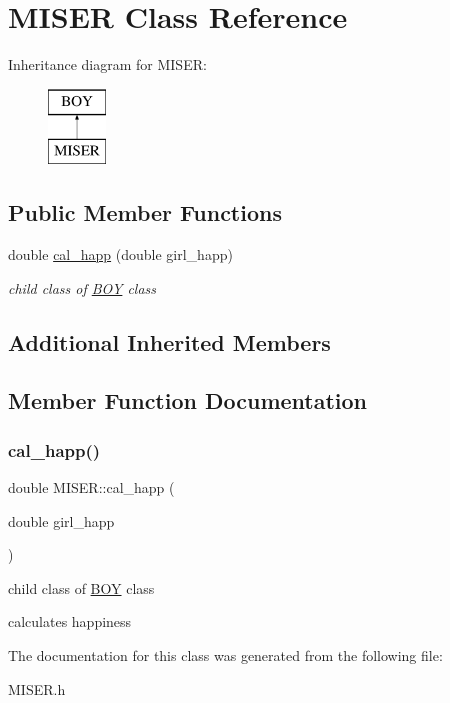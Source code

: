 \hypertarget{classMISER}{}\section{M\+I\+S\+ER Class Reference}
\label{classMISER}
Inheritance diagram for M\+I\+S\+ER\+:\begin{figure}[H]
\begin{center}
\leavevmode
\includegraphics[height=2.000000cm]{classMISER}
\end{center}
\end{figure}
\subsection*{Public Member Functions}
\begin{DoxyCompactItemize}
\item 
double \hyperlink{classMISER_a178be2918344f7c56b1d64b531053cd1}{cal\+\_\+happ} (double girl\+\_\+happ)
\begin{DoxyCompactList}\small\item\em child class of \hyperlink{classBOY}{B\+OY} class \end{DoxyCompactList}\end{DoxyCompactItemize}
\subsection*{Additional Inherited Members}


\subsection{Member Function Documentation}
\mbox{\label{classMISER_a178be2918344f7c56b1d64b531053cd1}} 
\subsubsection{\texorpdfstring{cal\+\_\+happ()}{cal\_happ()}}
{\footnotesize\ttfamily double M\+I\+S\+E\+R\+::cal\+\_\+happ (\begin{DoxyParamCaption}\item[{double}]{girl\+\_\+happ }\end{DoxyParamCaption})\hspace{0.3cm}{\ttfamily [inline]}}



child class of \hyperlink{classBOY}{B\+OY} class 

calculates happiness 

The documentation for this class was generated from the following file\+:\begin{DoxyCompactItemize}
\item 
M\+I\+S\+E\+R.\+h\end{DoxyCompactItemize}
